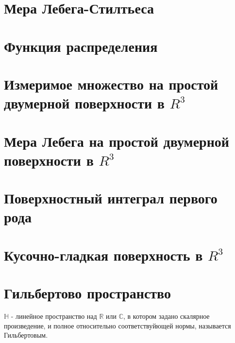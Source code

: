 \documentclass[paper=a4, fontsize=17pt]{article}
\begin{document}
\section{Мера Лебега-Стилтьеса}

\section{Функция распределения}

\section{Измеримое множество на простой двумерной поверхности в $R^3$}

\section{Мера Лебега на простой двумерной поверхности в $R^3$}

\section{Поверхностный интеграл первого рода}

\section{Кусочно-гладкая поверхность в $R^3$}

\section{Гильбертово пространство}
$\mathds{H}$ - линейное пространство над $\mathds{R}$ или $\mathds{C}$, в котором задано скалярное произведение, и полное относительно соответствуйющей нормы, называется Гильбертовым.
\end{document}
